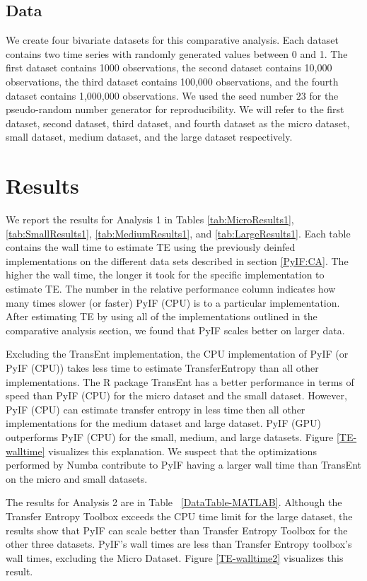 \subsection{Data}

We create four bivariate datasets for this comparative analysis. Each dataset contains two time series with randomly generated values between 0 and 1. The first dataset contains 1000 observations, the second dataset contains 10,000 observations, the third dataset contains 100,000 observations, and the fourth dataset contains 1,000,000 observations.  We used the seed number  \(23\) for the pseudo-random number generator for reproducibility. We will refer to the first dataset, second dataset, third dataset, and fourth dataset as the micro dataset, small dataset, medium dataset, and the large dataset respectively.

\section{Results}

We report the results for Analysis 1 in Tables \ref{tab:MicroResults1},  \ref{tab:SmallResults1}, \ref{tab:MediumResults1}, and \ref{tab:LargeResults1}.  Each table contains the wall time to estimate TE using the previously deinfed implementations on the different data sets described in section \ref{PyIF:CA}.  The higher the wall time, the longer it took for the specific implementation to estimate TE.  The number in the relative performance column indicates how many times slower (or faster) PyIF (CPU) is to a particular implementation.  After estimating TE by using all of the implementations outlined in the comparative analysis section, we found that PyIF scales better on larger data.  

Excluding the TransEnt implementation, the CPU implementation of PyIF (or PyIF (CPU)) takes less time to estimate TransferEntropy than all other implementations. The R package TransEnt has a better performance in terms of speed than PyIF (CPU) for the micro dataset and the small dataset. However, PyIF (CPU) can estimate transfer entropy in less time then all other implementations for the medium dataset and large dataset. PyIF (GPU) outperforms PyIF (CPU) for the small, medium, and large datasets. Figure \ref{TE-walltime} visualizes this explanation. We suspect that the optimizations performed by Numba contribute to PyIF having a larger wall time than TransEnt on the micro and small datasets.

The results for Analysis 2 are in Table ~\ref{DataTable-MATLAB}.  Although the Transfer Entropy Toolbox exceeds the CPU time limit for the large dataset, the results show that PyIF can scale better than Transfer Entropy Toolbox for the other three datasets. PyIF's wall times are less than Transfer Entropy toolbox's wall times, excluding the Micro Dataset.  Figure \ref{TE-walltime2} visualizes this result.


